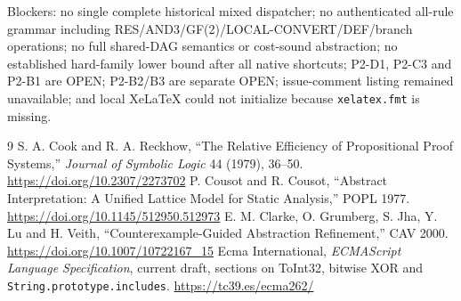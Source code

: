 \documentclass[11pt]{article}
\begin{document}
Blockers: no single complete historical mixed dispatcher; no authenticated all-rule grammar including RES/AND3/GF(2)/LOCAL-CONVERT/DEF/branch operations; no full shared-DAG semantics or cost-sound abstraction; no established hard-family lower bound after all native shortcuts; P2-D1, P2-C3 and P2-B1 are OPEN; P2-B2/B3 are separate OPEN; issue-comment listing remained unavailable; and local XeLaTeX could not initialize because \texttt{xelatex.fmt} is missing.

\begin{thebibliography}{9}
 S. A. Cook and R. A. Reckhow, ``The Relative Efficiency of Propositional Proof Systems,'' \emph{Journal of Symbolic Logic} 44 (1979), 36--50. \url{https://doi.org/10.2307/2273702}
 P. Cousot and R. Cousot, ``Abstract Interpretation: A Unified Lattice Model for Static Analysis,'' POPL 1977. \url{https://doi.org/10.1145/512950.512973}
 E. M. Clarke, O. Grumberg, S. Jha, Y. Lu and H. Veith, ``Counterexample-Guided Abstraction Refinement,'' CAV 2000. \url{https://doi.org/10.1007/10722167_15}
 Ecma International, \emph{ECMAScript Language Specification}, current draft, sections on ToInt32, bitwise XOR and \texttt{String.prototype.includes}. \url{https://tc39.es/ecma262/}
\end{thebibliography}
\end{document}
